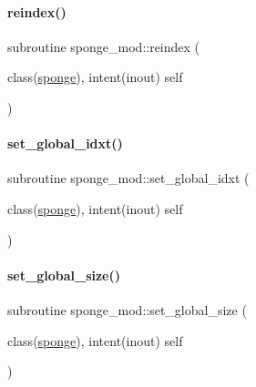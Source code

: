 \mbox{\label{namespacesponge__mod_a0c7e9f96ac71dba07a66c590bf4ce653}} 
\paragraph{\texorpdfstring{reindex()}{reindex()}}
{\footnotesize\ttfamily subroutine sponge\+\_\+mod\+::reindex (\begin{DoxyParamCaption}\item[{class(\mbox{\hyperlink{structsponge__mod_1_1sponge}{sponge}}), intent(inout)}]{self }\end{DoxyParamCaption})\hspace{0.3cm}{\ttfamily [private]}}

\mbox{\label{namespacesponge__mod_afd5f45edb5ca5d029745c0e77aea263e}} 
\paragraph{\texorpdfstring{set\+\_\+global\+\_\+idxt()}{set\_global\_idxt()}}
{\footnotesize\ttfamily subroutine sponge\+\_\+mod\+::set\+\_\+global\+\_\+idxt (\begin{DoxyParamCaption}\item[{class(\mbox{\hyperlink{structsponge__mod_1_1sponge}{sponge}}), intent(inout)}]{self }\end{DoxyParamCaption})\hspace{0.3cm}{\ttfamily [private]}}

\mbox{\label{namespacesponge__mod_a376ff12b55a16f0d269473358d14d3d4}} 
\paragraph{\texorpdfstring{set\+\_\+global\+\_\+size()}{set\_global\_size()}}
{\footnotesize\ttfamily subroutine sponge\+\_\+mod\+::set\+\_\+global\+\_\+size (\begin{DoxyParamCaption}\item[{class(\mbox{\hyperlink{structsponge__mod_1_1sponge}{sponge}}), intent(inout)}]{self }\end{DoxyParamCaption})\hspace{0.3cm}{\ttfamily [private]}}

